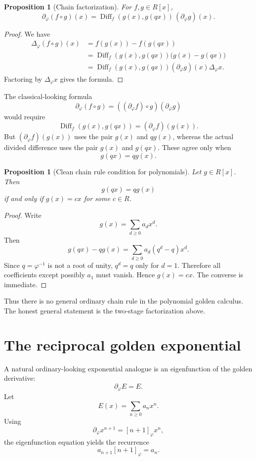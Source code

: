 \documentclass[11pt]{article}
\newtheorem{proposition}[definition]{Proposition}
\newcommand{\Diff}{\operatorname{Diff}}
\newcommand{\ph}{\varphi}
\newcommand{\dd}{\partial_{\ph}}
\newcommand{\Del}{\Delta_{\ph}}
\begin{document}
\begin{proposition}[Chain factorization]
For $f,g\in R[x]$,
\[
    \dd(f\circ g)(x)=\Diff_f(g(x),g(qx))\, (\dd g)(x).
\]
\end{proposition}

\begin{proof}
We have
\begin{align*}
    \Del(f\circ g)(x)
    &= f(g(x))-f(g(qx))\\
    &= \Diff_f(g(x),g(qx))\bigl(g(x)-g(qx)\bigr)\\
    &= \Diff_f(g(x),g(qx))(\dd g)(x)\Del x.
\end{align*}
Factoring by $\Del x$ gives the formula.
\end{proof}

The classical-looking formula
\[
    \dd(f\circ g)=((\dd f)\circ g)(\dd g)
\]
would require
\[
    \Diff_f(g(x),g(qx))=(\dd f)(g(x)).
\]
But $(\dd f)(g(x))$ uses the pair $g(x)$ and $qg(x)$, whereas the actual divided difference uses the pair $g(x)$ and $g(qx)$.  These agree only when
\[
    g(qx)=qg(x).
\]

\begin{proposition}[Clean chain rule condition for polynomials]
Let $g\in R[x]$.  Then
\[
    g(qx)=qg(x)
\]
if and only if $g(x)=cx$ for some $c\in R$.
\end{proposition}

\begin{proof}
Write
\[
    g(x)=\sum_{d\ge0}a_dx^d.
\]
Then
\[
    g(qx)-qg(x)=\sum_{d\ge0}a_d(q^d-q)x^d.
\]
Since $q=\ph^{-1}$ is not a root of unity, $q^d=q$ only for $d=1$.  Therefore all coefficients except possibly $a_1$ must vanish.  Hence $g(x)=cx$.  The converse is immediate.
\end{proof}

Thus there is no general ordinary chain rule in the polynomial golden calculus.  The honest general statement is the two-stage factorization above.

\section{The reciprocal golden exponential}

A natural ordinary-looking exponential analogue is an eigenfunction of the golden derivative:
\[
    \dd E=E.
\]
Let
\[
    E(x)=\sum_{n\ge0}a_nx^n.
\]
Using
\[
    \dd x^{n+1}=[n+1]_{\ph}x^n,
\]
the eigenfunction equation yields the recurrence
\[
    a_{n+1}[n+1]_{\ph}=a_n.
\]
\end{document}
